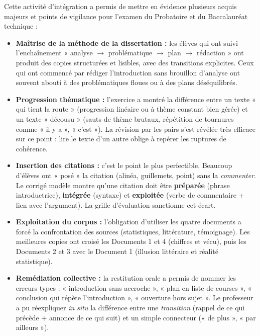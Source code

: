 \documentclass[11pt]{article}
\newcounter{popsec}
\newcounter{popsub}
\newcommand{\courssub}[1]{%
  \stepcounter{popsub}%
  \par\vspace{9pt}\noindent{\popxbold\fontsize{11.5}{13}\selectfont\color{popink}{\color{poporange}\thepopsec.\thepopsub}\hspace{6pt}#1}\par\nopagebreak\vspace{4pt}
}
\begin{document}
\courssub{Bilan de l'activité}
Cette activité d'intégration a permis de mettre en évidence plusieurs acquis majeurs et points de vigilance pour l'examen du Probatoire et du Baccalauréat technique :

\begin{itemize}
    \item \textbf{Maîtrise de la méthode de la dissertation :} les élèves qui ont suivi l'enchaînement « analyse $\rightarrow$ problématique $\rightarrow$ plan $\rightarrow$ rédaction » ont produit des copies structurées et lisibles, avec des transitions explicites. Ceux qui ont commencé par rédiger l'introduction sans brouillon d'analyse ont souvent abouti à des problématiques floues ou à des plans déséquilibrés.
    \item \textbf{Progression thématique :} l'exercice a montré la différence entre un texte « qui tient la route » (progression linéaire ou à thème constant bien gérée) et un texte « décousu » (sauts de thème brutaux, répétition de tournures comme « il y a », « c'est »). La révision par les pairs s'est révélée très efficace sur ce point : lire le texte d'un autre oblige à repérer les ruptures de cohérence.
    \item \textbf{Insertion des citations :} c'est le point le plus perfectible. Beaucoup d'élèves ont « posé » la citation (alinéa, guillemets, point) sans la \emph{commenter}. Le corrigé modèle montre qu'une citation doit être \textbf{préparée} (phrase introductrice), \textbf{intégrée} (syntaxe) et \textbf{exploitée} (verbe de commentaire + lien avec l'argument). La grille d'évaluation sanctionne cet écart.
    \item \textbf{Exploitation du corpus :} l'obligation d'utiliser les quatre documents a forcé la confrontation des sources (statistiques, littérature, témoignage). Les meilleures copies ont croisé les Documents 1 et 4 (chiffres et vécu), puis les Documents 2 et 3 avec le Document 1 (illusion littéraire et réalité statistique).
    \item \textbf{Remédiation collective :} la restitution orale a permis de nommer les erreurs types : « introduction sans accroche », « plan en liste de courses », « conclusion qui répète l'introduction », « ouverture hors sujet ». Le professeur a pu réexpliquer \emph{in situ} la différence entre une \emph{transition} (rappel de ce qui précède + annonce de ce qui suit) et un simple connecteur (« de plus », « par ailleurs »).
\end{itemize}
\end{document}
